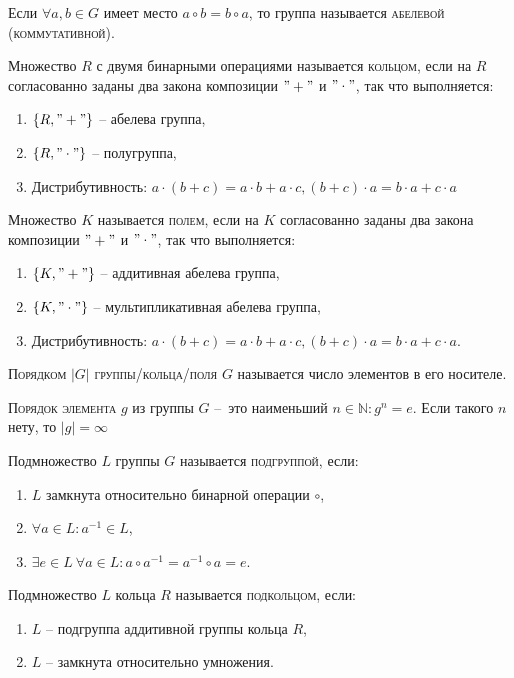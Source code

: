 \documentclass{article}
\begin{document}
Если $\forall a,b\in G$ имеет место $a\circ b=b\circ a$, то группа называется \textsc{абелевой (коммутативной)}.

Множество $R$ с двумя бинарными операциями называется \textsc{кольцом}, если на $R$ согласованно заданы два закона композиции $"+"$ и $"\cdot"$, так что выполняется:
\begin{enumerate}
    \item $\{ R, "+"\}$ – абелева группа,
    \item $\{ R, "\cdot"\}$ – полугруппа,
    \item Дистрибутивность: $a\cdot(b+c)=a\cdot b+a\cdot c, (b+c)\cdot a=b\cdot a+c\cdot a$
\end{enumerate}

Множество $K$ называется \textsc{полем}, если на $K$ согласованно заданы два закона композиции $"+"$ и $"\cdot"$, так что выполняется:
\begin{enumerate}
    \item $\{K, "+"\}$ – аддитивная абелева группа,
    \item $\{K, "\cdot"\}$ – мультипликативная абелева группа,
    \item Дистрибутивность: $a\cdot(b+c)=a\cdot b+a\cdot c, (b+c)\cdot a=b\cdot a+c\cdot a.$
\end{enumerate}

\textsc{Порядком {$|G|$} группы/кольца/поля {$G$}} называется число элементов в его носителе. 

\textsc{Порядок элемента {$g$}} из группы $G$ – это наименьший $n\in \mathbb{N}\colon g^n=e.$ Если такого $n$ нету, то $|g|=\infty$

Подмножество $L$ группы $G$ называется \textsc{подгруппой}, если:
\begin{enumerate}
    \item $L$ замкнута относительно бинарной операции $\circ$,
    \item $\forall a\in L\colon a^{-1}\in L$,
    \item $\exists e\in L\ \forall a\in L\colon a\circ a^{-1}=a^{-1}\circ a=e$.
\end{enumerate}

Подмножество $L$ кольца $R$ называется \textsc{подкольцом}, если:
\begin{enumerate}
    \item $L$ – подгруппа аддитивной группы кольца $R$,
    \item $L$ – замкнута относительно умножения.
\end{enumerate}
\end{document}
